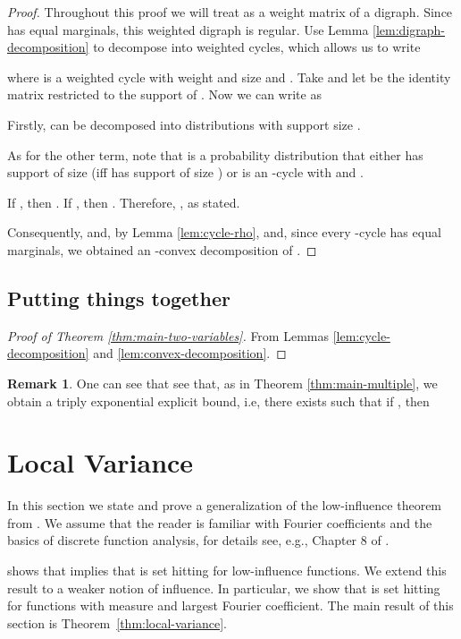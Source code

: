 \documentclass{daj}
\newcommand{\1}{\mathbbm{1}}
\theoremstyle{plain}
\theoremstyle{definition}
\newtheorem{remark}[theorem]{Remark}
\begin{document}
\begin{proof}
Throughout this proof we will treat  as a weight matrix of
a digraph. Since  has equal marginals, this weighted digraph is regular.
Use Lemma \ref{lem:digraph-decomposition} to decompose
 into weighted cycles, which allows us to write

where  is a weighted cycle with weight  and size 
and .
Take  and let
 be the identity matrix restricted to the support of . Now we
can write  as


Firstly, 
can be decomposed into distributions with support size .

As for the other term, note that 
 is a probability
distribution that
either has support of size  (iff  has
support of size ) or is an -cycle with 
 and .

If , then . If , then
.
Therefore, , as stated.

Consequently, 
and, by Lemma \ref{lem:cycle-rho}, 
 and, since
every -cycle has equal marginals,
we obtained
an -convex decomposition of .
\end{proof}

\subsection{Putting things together}

\begin{proof}[Proof of Theorem \ref{thm:main-two-variables}]
From Lemmas \ref{lem:cycle-decomposition} and
\ref{lem:convex-decomposition}.
\end{proof}

\begin{remark}
One can see that see that, as in Theorem \ref{thm:main-multiple}, we obtain
a triply exponential explicit bound, i.e, there exists 
 such that if , then

\end{remark}

\section{Local Variance}
\label{sec:local-variance}

In this section we state and prove a generalization of the low-influence theorem 
from \cite{Mos10}. We assume that the reader is familiar with
Fourier coefficients  and the basics of discrete function 
analysis, for details see, e.g., Chapter 8 of \cite{Dol14}. 

\cite{Mos10} shows that  implies that  is set hitting
for low-influence functions. We extend this result to
a weaker notion of influence. In particular, we show that  is set hitting
for functions with  measure and  largest Fourier coefficient.
The main result of this section is Theorem~\ref{thm:local-variance}.
\end{document}
